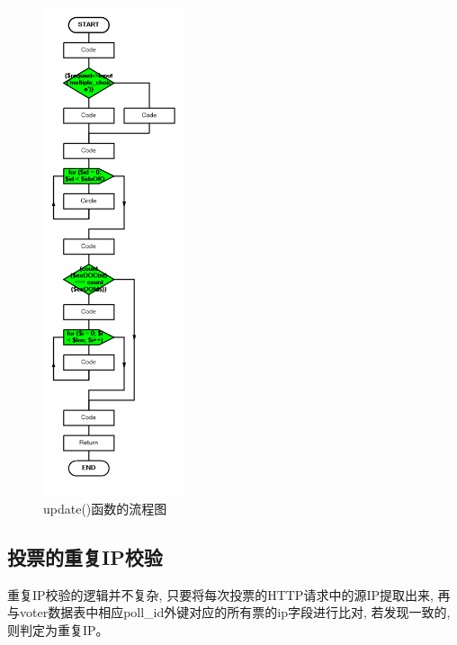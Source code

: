 \begin{figure}[hbp]
    \centering
    \includegraphics[width=0.37\textwidth]{support-files/4.5.1-pollcontroller-update-flowchart.png}
    \caption{update()函数的流程图}
    \label{fig:updateflowchart}
\end{figure}

\newpage

\subsection{投票的重复IP校验}

重复IP校验的逻辑并不复杂, 只要将每次投票的HTTP请求中的源IP提取出来, 再与voter数据表中相应poll\_id外键对应的所有票的ip字段进行比对, 若发现一致的, 则判定为重复IP。

